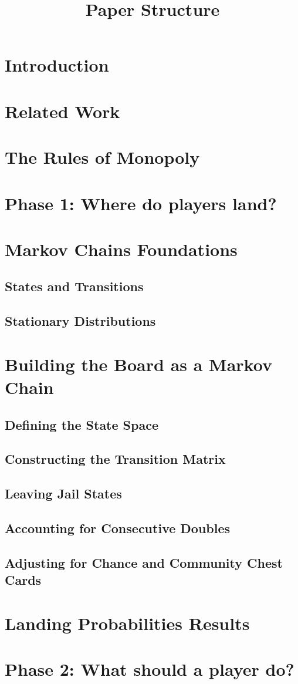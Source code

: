 \documentclass[12pt]{article}
\begin{document}
\title{Paper Structure}


\section{Introduction}


\section{Related Work}


\section{The Rules of Monopoly}

\section*{Phase 1: Where do players land?}

\section{Markov Chains Foundations}
\subsection{States and Transitions}
\subsection{Stationary Distributions}

\section{Building the Board as a Markov Chain}
\subsection{Defining the State Space}
\subsection{Constructing the Transition Matrix}
\subsection{Leaving Jail States}
\subsection{Accounting for Consecutive Doubles}
\subsection{Adjusting for Chance and Community Chest Cards}

\section{Landing Probabilities Results}

\section*{Phase 2: What should a player do?}
\end{document}
